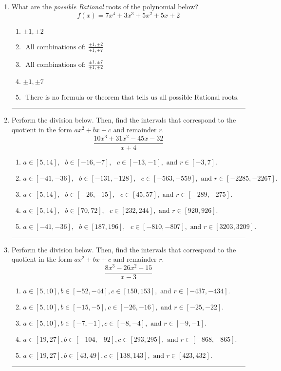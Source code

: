 \documentclass[14pt]{extbook}
\newcommand{\litem}[1]{\item#1\hspace*{-1cm}\rule{\textwidth}{0.4pt}}
\begin{document}
\begin{enumerate}
{\begin{enumerate}[label=\Alph*.]
\end{enumerate} }
\litem{
What are the \textit{possible Rational} roots of the polynomial below?\[ f(x) = 7x^{4} +3 x^{3} +5 x^{2} +5 x + 2 \]\begin{enumerate}[label=\Alph*.]
\item \( \pm 1,\pm 2 \)
\item \( \text{ All combinations of: }\frac{\pm 1,\pm 2}{\pm 1,\pm 7} \)
\item \( \text{ All combinations of: }\frac{\pm 1,\pm 7}{\pm 1,\pm 2} \)
\item \( \pm 1,\pm 7 \)
\item \( \text{ There is no formula or theorem that tells us all possible Rational roots.} \)

\end{enumerate} }
\litem{
Perform the division below. Then, find the intervals that correspond to the quotient in the form $ax^2+bx+c$ and remainder $r$.\[ \frac{10x^{3} +31 x^{2} -45 x -32}{x + 4} \]\begin{enumerate}[label=\Alph*.]
\item \( a \in [5, 14], \text{   } b \in [-16, -7], \text{   } c \in [-13, -1], \text{   and   } r \in [-3, 7]. \)
\item \( a \in [-41, -36], \text{   } b \in [-131, -128], \text{   } c \in [-563, -559], \text{   and   } r \in [-2285, -2267]. \)
\item \( a \in [5, 14], \text{   } b \in [-26, -15], \text{   } c \in [45, 57], \text{   and   } r \in [-289, -275]. \)
\item \( a \in [5, 14], \text{   } b \in [70, 72], \text{   } c \in [232, 244], \text{   and   } r \in [920, 926]. \)
\item \( a \in [-41, -36], \text{   } b \in [187, 196], \text{   } c \in [-810, -807], \text{   and   } r \in [3203, 3209]. \)

\end{enumerate} }
\litem{
Perform the division below. Then, find the intervals that correspond to the quotient in the form $ax^2+bx+c$ and remainder $r$.\[ \frac{8x^{3} -26 x^{2} + 15}{x -3} \]\begin{enumerate}[label=\Alph*.]
\item \( a \in [5, 10], b \in [-52, -44], c \in [150, 153], \text{ and } r \in [-437, -434]. \)
\item \( a \in [5, 10], b \in [-15, -5], c \in [-26, -16], \text{ and } r \in [-25, -22]. \)
\item \( a \in [5, 10], b \in [-7, -1], c \in [-8, -4], \text{ and } r \in [-9, -1]. \)
\item \( a \in [19, 27], b \in [-104, -92], c \in [293, 295], \text{ and } r \in [-868, -865]. \)
\item \( a \in [19, 27], b \in [43, 49], c \in [138, 143], \text{ and } r \in [423, 432]. \)


\end{enumerate}}
\end{enumerate}
\end{document}
